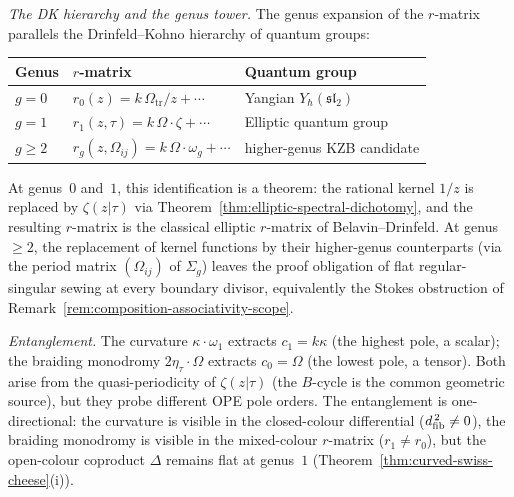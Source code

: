 \begin{computation}
\smallskip
\noindent
\emph{The DK hierarchy and the genus tower.}
The genus expansion of the $r$-matrix parallels
the Drinfeld--Kohno hierarchy of quantum groups:
\begin{center}
\small
\renewcommand{\arraystretch}{1.3}
\begin{tabular}{lll}
\toprule
\textbf{Genus} & \textbf{$r$-matrix} &
 \textbf{Quantum group} \\
\midrule
$g = 0$ & $r_0(z) = k\,\Omega_{\mathrm{tr}}/z + \cdots$
 & Yangian $Y_\hbar(\mathfrak{sl}_2)$ \\
$g = 1$ & $r_1(z,\tau) = k\,\Omega\cdot\zeta + \cdots$
 & Elliptic quantum group \\
$g \ge 2$ & $r_g(z,\Omega_{ij}) = k\,\Omega\cdot\omega_g + \cdots$
 & higher-genus KZB candidate \\
\bottomrule
\end{tabular}
\end{center}
At genus~$0$ and~$1$, this identification is a theorem:
the rational kernel $1/z$ is replaced by
$\zeta(z|\tau)$ via
Theorem~\ref{thm:elliptic-spectral-dichotomy},
and the resulting $r$-matrix is the classical
elliptic $r$-matrix of Belavin--Drinfeld.
At genus~$\ge 2$, the replacement of kernel functions
by their higher-genus counterparts (via the
period matrix $(\Omega_{ij})$ of $\Sigma_g$) leaves the
proof obligation of flat regular-singular sewing at every
boundary divisor, equivalently the Stokes obstruction of
Remark~\ref{rem:composition-associativity-scope}.

\smallskip
\noindent
\emph{Entanglement.}
The curvature $\kappa \cdot \omega_1$ extracts $c_1 = k\kappa$
(the highest pole, a scalar); the braiding monodromy
$2\eta_\tau \cdot \Omega$ extracts $c_0 = \Omega$
(the lowest pole, a tensor). Both arise from the
quasi-periodicity of $\zeta(z|\tau)$ (the $B$-cycle is
the common geometric source), but they probe different
OPE pole orders. The entanglement is one-directional:
the curvature is visible in the closed-colour
differential ($d_{\mathrm{fib}}^{\,2} \ne 0$), the braiding monodromy is
visible in the mixed-colour $r$-matrix ($r_1 \ne r_0$),
but the open-colour coproduct $\Delta$ remains
flat at genus~$1$
(Theorem~\ref{thm:curved-swiss-cheese}(i)).
\end{computation}

